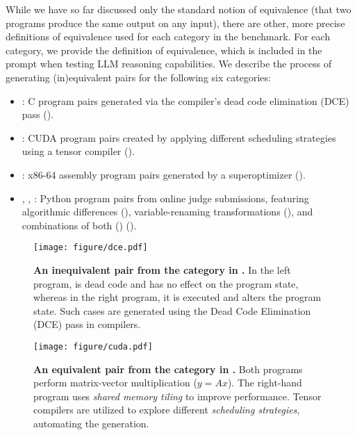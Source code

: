 While we have so far discussed only the standard notion of equivalence (that two programs produce the same output on any input), there are other, more precise definitions of equivalence used for each category in the benchmark. For each category, we provide the definition of equivalence, which is included in the prompt when testing LLM reasoning capabilities. We describe the process of generating (in)equivalent pairs for the following six categories:

\begin{itemize}
    \item \textbf{\dce}: C program pairs generated via the compiler's dead code elimination (DCE) pass ().

    \item \textbf{\cuda}: CUDA program pairs created by applying different scheduling strategies using a tensor compiler ().
    
    \item \textbf{\ass}: x86-64 assembly program pairs generated by a superoptimizer ().
    
    \item \textbf{\oja}, \textbf{\ojv}, \textbf{\ojva}: Python program pairs from online judge submissions, featuring algorithmic differences (\oja), variable-renaming transformations (\ojv), and combinations of both (\ojva) ().
\end{itemize}





\begin{figure}[!tb]
\centering
\texttt{[image: figure/dce.pdf]}
\caption{\textbf{An inequivalent pair from the \dce category in \name.} In the left program,  is dead code and has no effect on the program state, whereas in the right program, it is executed and alters the program state. Such cases are generated using the Dead Code Elimination (DCE) pass in compilers.}
\label{fig:dce}
\end{figure}

\begin{figure*}[!tb]
\centering
\texttt{[image: figure/cuda.pdf]}
\caption{\textbf{An equivalent pair from the \cuda category in \name.} Both programs perform matrix-vector multiplication ($y = Ax$). The right-hand program uses \emph{shared memory tiling} to improve performance. Tensor compilers are utilized to explore different \emph{scheduling strategies}, automating the generation.}
\label{fig:cuda}
\end{figure*}


